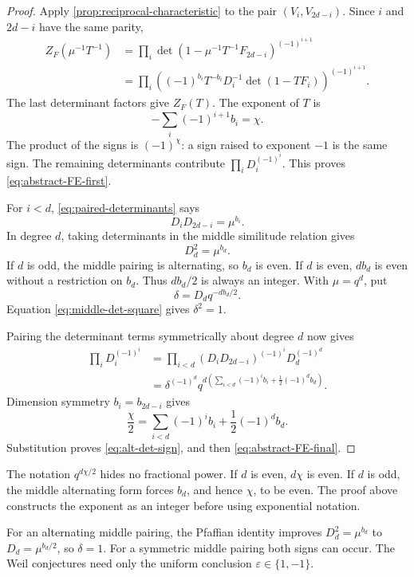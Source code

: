 \begin{proof}
Apply \cref{prop:reciprocal-characteristic} to the pair
\((V_i,V_{2d-i})\).  Since \(i\) and \(2d-i\) have the same parity,
\[
\begin{aligned}
 Z_F(\mu^{-1}T^{-1})
 &=\prod_i
 \det(1-\mu^{-1}T^{-1}F_{2d-i})^{(-1)^{i+1}}\\
 &=\prod_i
 \left((-1)^{b_i}T^{-b_i}D_i^{-1}
       \det(1-TF_i)\right)^{(-1)^{i+1}}.
\end{aligned}
\]
The last determinant factors give \(Z_F(T)\).  The exponent of \(T\) is
\[
 -\sum_i(-1)^{i+1}b_i=\chi.
\]
The product of the signs is \((-1)^\chi\): a sign raised to exponent
\(-1\) is the same sign.  The remaining determinants contribute
\(\prod_iD_i^{(-1)^i}\).  This proves
\eqref{eq:abstract-FE-first}.

For \(i<d\), \eqref{eq:paired-determinants} says
\[
 D_iD_{2d-i}=\mu^{b_i}.
 \tag{2.18}\label{eq:det-pairs}
\]
In degree \(d\), taking determinants in the middle similitude relation
gives
\[
 D_d^2=\mu^{b_d}.
 \tag{2.19}\label{eq:middle-det-square}
\]
If \(d\) is odd, the middle pairing is alternating, so \(b_d\) is even.
If \(d\) is even, \(db_d\) is even without a restriction on \(b_d\).
Thus \(db_d/2\) is always an integer.  With \(\mu=q^d\), put
\[
 \delta=D_dq^{-db_d/2}.
\]
Equation \eqref{eq:middle-det-square} gives \(\delta^2=1\).

Pairing the determinant terms symmetrically about degree \(d\) now gives
\[
\begin{aligned}
 \prod_iD_i^{(-1)^i}
 &=\prod_{i<d}(D_iD_{2d-i})^{(-1)^i}
     D_d^{(-1)^d}\\
 &=\delta^{(-1)^d}
   q^{d\left(\sum_{i<d}(-1)^ib_i+
           \frac12(-1)^db_d\right)}.
\end{aligned}
\]
Dimension symmetry \(b_i=b_{2d-i}\) gives
\[
 \frac\chi2
 =\sum_{i<d}(-1)^ib_i+\frac12(-1)^db_d.
\]
Substitution proves \eqref{eq:alt-det-sign}, and then
\eqref{eq:abstract-FE-final}.
\end{proof}

\begin{remark}
The notation \(q^{d\chi/2}\) hides no fractional power.  If \(d\) is
even, \(d\chi\) is even.  If \(d\) is odd, the middle alternating form
forces \(b_d\), and hence \(\chi\), to be even.  The proof above
constructs the exponent as an integer before using exponential notation.
\end{remark}

\begin{remark}
For an alternating middle pairing, the Pfaffian identity improves
\(D_d^2=\mu^{b_d}\) to \(D_d=\mu^{b_d/2}\), so \(\delta=1\).  For a
symmetric middle pairing both signs can occur.  The Weil conjectures need
only the uniform conclusion \(\varepsilon\in\{1,-1\}\).
\end{remark}

